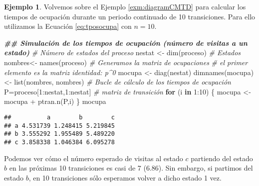 \documentclass[
]{book}
\newenvironment{Shaded}{\begin{snugshade}}{\end{snugshade}}
\newcommand{\CommentTok}[1]{\textcolor[rgb]{0.56,0.35,0.01}{\textit{#1}}}
\newcommand{\ControlFlowTok}[1]{\textcolor[rgb]{0.13,0.29,0.53}{\textbf{#1}}}
\newcommand{\DecValTok}[1]{\textcolor[rgb]{0.00,0.00,0.81}{#1}}
\newcommand{\DocumentationTok}[1]{\textcolor[rgb]{0.56,0.35,0.01}{\textbf{\textit{#1}}}}
\newcommand{\FunctionTok}[1]{\textcolor[rgb]{0.00,0.00,0.00}{#1}}
\newcommand{\NormalTok}[1]{#1}
\newcommand{\OtherTok}[1]{\textcolor[rgb]{0.56,0.35,0.01}{#1}}
\newcommand{\SpecialCharTok}[1]{\textcolor[rgb]{0.00,0.00,0.00}{#1}}
\theoremstyle{definition}
\theoremstyle{definition}
\newtheorem{example}{Ejemplo}[chapter]
\theoremstyle{definition}
\theoremstyle{definition}
\theoremstyle{remark}
\begin{document}
\begin{example}
Volvemos sobre el Ejemplo \ref{exm:diagramCMTD} para calcular los tiempos de ocupación durante un periodo continuado de 10 transiciones. Para ello utilizamos la Ecuación \eqref{eq:tposocupa} con \(n=10\).

\begin{Shaded}
\begin{Highlighting}[]
\DocumentationTok{\#\# Simulación de los tiempos de ocupación (número de visitas a un estado)}
\CommentTok{\# Número de estados del proceso}
\NormalTok{nestat }\OtherTok{\textless{}{-}} \FunctionTok{dim}\NormalTok{(proceso)}
\CommentTok{\# Estados}
\NormalTok{nombres}\OtherTok{\textless{}{-}} \FunctionTok{names}\NormalTok{(proceso)}
\CommentTok{\# Generamos la matriz de ocupaciones}
\CommentTok{\# el primer elemento es la matriz identidad: p\^{}0}
\NormalTok{mocupa }\OtherTok{\textless{}{-}} \FunctionTok{diag}\NormalTok{(nestat)}
  \FunctionTok{dimnames}\NormalTok{(mocupa) }\OtherTok{\textless{}{-}} \FunctionTok{list}\NormalTok{(nombres, nombres)}
\CommentTok{\# Bucle de cálculo de los tiempos de ocupación}
\NormalTok{P}\OtherTok{=}\NormalTok{proceso[}\DecValTok{1}\SpecialCharTok{:}\NormalTok{nestat,}\DecValTok{1}\SpecialCharTok{:}\NormalTok{nestat] }\CommentTok{\# matriz de transición}
\ControlFlowTok{for}\NormalTok{ (i }\ControlFlowTok{in} \DecValTok{1}\SpecialCharTok{:}\DecValTok{10}\NormalTok{)}
\NormalTok{\{}
\NormalTok{   mocupa }\OtherTok{\textless{}{-}}\NormalTok{ mocupa }\SpecialCharTok{+} \FunctionTok{ptran.n}\NormalTok{(P,i)}
\NormalTok{\}}
\NormalTok{mocupa}
\end{Highlighting}
\end{Shaded}

\begin{verbatim}
##          a        b        c
## a 4.531739 1.248415 5.219845
## b 3.555292 1.955489 5.489220
## c 3.858338 1.046384 6.095278
\end{verbatim}

Podemos ver cómo el número esperado de visitas al estado \(c\) partiendo del estado \(b\) en las próximas 10 transiciones es casi de 7 (6.86). Sin embargo, si partimos del estado \(b\), en 10 transiciones sólo esperamos volver a dicho estado 1 vez.
\end{example}
\end{document}

